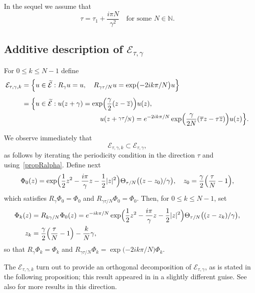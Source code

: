 \documentclass[JEP,XML,SOM,Unicode,NoFloatCountersInSection,published]{cedram}
\theoremstyle{definition}
\let\EE\exp
\let\ov\overline
\newcommand\N{\mathbb N}
\newcommand\E{\mathcal E}
\begin{document}
In the sequel we assume that
\begin{equation*}
\tau=\tau_1+\frac{i\pi N}{\gamma^2}\quad \text{for some } N \in \N.
\end{equation*}

\subsection{Additive description of $\E_{\tau,\gamma}$}

For $0\leq k\leq N-1$ define
\begin{align*}
\mathcal{E}_{\tau,\gamma,k}&=\Bigl\{u\in \widetilde{\mathcal{E}}: R_\gamma u=u,\quad R_{{\gamma \tau}/N} u= \EE\bigl({-{2ik\pi}/N}\bigr) u\Bigr\}\\[5pt]
&=\Bigl\{u\in \widetilde{\mathcal{E}}: u(z+\gamma)=\EE\Bigl(\frac{\gamma}2(z-\ov{z})\Bigr) u(z),\\
&\hspace*{4cm}u(z+\sfrac{\gamma \tau}{N})= e^{-{2ik\pi}/N} \EE\Bigl(\frac{\gamma}{2N} (\ov{\tau}z-\tau\ov{z})\Bigr)u(z)\Bigr\}.
\end{align*}

We observe immediately that
\[
\mathcal{E}_{\tau,\gamma,k} \subset \mathcal{E}_{\tau,\gamma},
\]
as follows by iterating the periodicity condition in the direction $\tau$ and using~\eqref{propRalpha}.
Define next
\begin{equation}\label{defPhi0}
\Phi_{0}(z)=\EE\Bigl({\frac{1}{2} z^2 -\frac{i\pi}{\gamma} z - \frac{1}{2} |z|^2} \Bigr) \Theta_{{\tau}/{N}}\bigl((z-z_{0})/{\gamma}\bigr), \quad z_0=\frac{\gamma}2 \Bigl(\frac{\tau}N-1 \Bigr),
\end{equation}
which satisfies $R_\gamma \Phi_{0}= \Phi_{0}$ and $R_{{\gamma \tau}/N} \Phi_{0}= \Phi_{0}$. Then,
for $0\leq k\leq N-1$, set
\begin{align*}
\Phi_{k}(z)&=R_{{k \gamma}/N} \Phi_{0}(z)=e^{-{ik\pi}/N}\EE\Bigl({\frac{1}{2} z^2 -\frac{i\pi}{\gamma} z - \frac{1}{2} |z|^2} \Bigr)\Theta_{{\tau}/{N}}\bigl((z-z_{k})/\gamma\bigr),
\\
z_k&=\frac{\gamma}2 \Bigl(\frac{\tau}N-1 \Bigr)-\frac{k}{N}\gamma,
\end{align*}
so that $R_\gamma \Phi_{k}= \Phi_{k}$ and $R_{{\gamma \tau}/N} \Phi_{k}=\EE\bigl({-{2ik\pi}/N}\bigr) \Phi_{k}$. 

The $\mathcal{E}_{\tau,\gamma,k}$ turn out to provide an orthogonal decomposition of $\mathcal{E}_{\tau,\gamma}$, as is stated in the following proposition; this result appeared in \cite{Nier2} in a slightly different guise. See also \cite{Perice,Nguyen-Rougerie} for more results in this direction.
\end{document}
